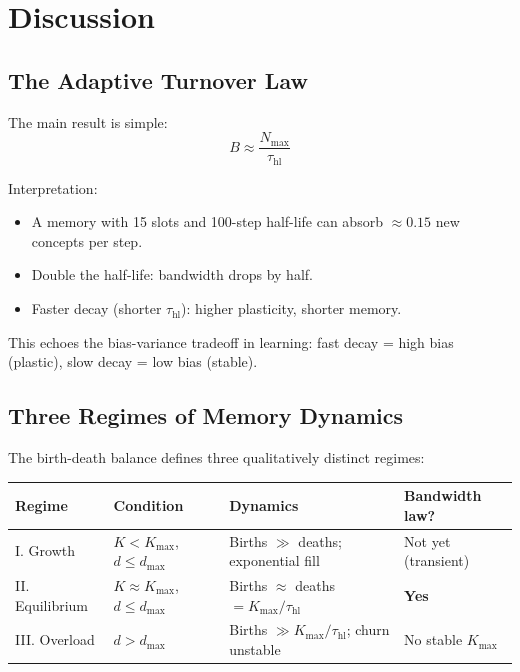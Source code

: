 \documentclass[11pt]{article}
\begin{document}
%
%

\section{Discussion}

\subsection{The Adaptive Turnover Law}

The main result is simple:
\[
  B \approx \frac{N_{\max}}{\tau_{\text{hl}}}
\]

Interpretation:
\begin{itemize}
  \item A memory with 15 slots and 100-step half-life can absorb $\approx 0.15$ new concepts per step.
  \item Double the half-life: bandwidth drops by half.
  \item Faster decay (shorter $\tau_{\text{hl}}$): higher plasticity, shorter memory.
\end{itemize}

This echoes the bias-variance tradeoff in learning: fast decay = high bias (plastic), slow decay = low bias (stable).

\subsection{Three Regimes of Memory Dynamics}

The birth-death balance defines three qualitatively distinct regimes:

\begin{center}
\begin{tabular}{llll}
\toprule
\textbf{Regime} & \textbf{Condition} & \textbf{Dynamics} & \textbf{Bandwidth law?} \\
\midrule
I. Growth & $K < K_{\max}$, $d \leq d_{\max}$ & Births $\gg$ deaths; exponential fill & Not yet (transient) \\
II. Equilibrium & $K \approx K_{\max}$, $d \leq d_{\max}$ & Births $\approx$ deaths $= K_{\max}/\tau_{\text{hl}}$ & \textbf{Yes} \\
III. Overload & $d > d_{\max}$ & Births $\gg K_{\max}/\tau_{\text{hl}}$; churn unstable & No stable $K_{\max}$ \\
\bottomrule
\end{tabular}
\end{center}
\end{document}
